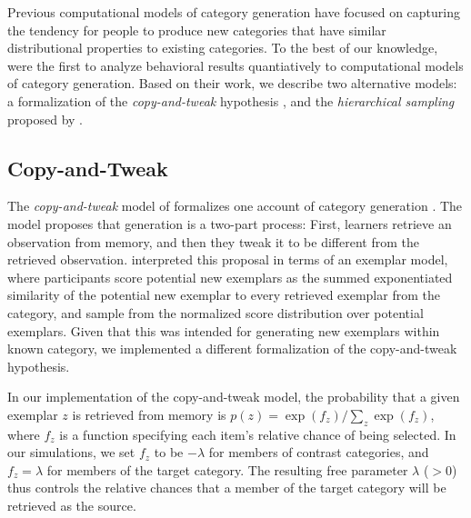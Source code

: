 \documentclass[10pt,letterpaper]{article}
\begin{document}
Previous computational models of category generation have focused on capturing the tendency for people to produce new categories that have similar distributional properties to existing categories. To the best of our knowledge, \citet{jern2013probabilistic} were the first to analyze behavioral results quantiatively to computational models of category generation. Based on their work, we describe two alternative models: a formalization of the \textit{copy-and-tweak} hypothesis \citep{ward2002role,ward1995s}, and the \textit{hierarchical sampling} proposed by \citet{jern2013probabilistic}.


\subsection{Copy-and-Tweak}
The \textit{copy-and-tweak} model of \citet{jern2013probabilistic} formalizes one account of category generation \citep[see][]{ward2002role,ward1995s}. The model proposes that generation is a two-part process: First, learners retrieve an observation from memory, and then they tweak it to be different from the retrieved observation. \citet{jern2013probabilistic} interpreted this proposal in terms of an exemplar model, where participants score potential new exemplars as the summed exponentiated similarity of the potential new exemplar to every retrieved exemplar from the category, and sample from the normalized score distribution over potential exemplars. Given that this was intended for generating new exemplars within known category, we implemented a different formalization of the copy-and-tweak hypothesis.

In our implementation of the copy-and-tweak model, the probability that a given exemplar $z$ is retrieved from memory is $p(z) = \exp(f_z) / \sum_z{ \exp(f_z) }$, where $f_z$ is a function specifying each item's relative chance of being selected. In our simulations, we set $f_z$ to be $-\lambda$ for members of contrast categories, and $f_z = \lambda$ for members of the target category. The resulting free parameter $\lambda$ ($>0$) thus controls the relative chances that a member of the target category will be retrieved as the source. 
\end{document}
